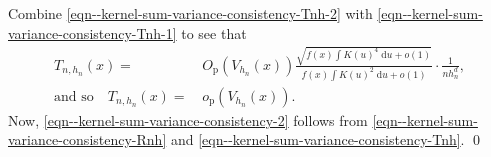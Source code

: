 Combine \eqref{eqn--kernel-sum-variance-consistency-Tnh-2} with
\eqref{eqn--kernel-sum-variance-consistency-Tnh-1} to see that
\begin{equation}
  \begin{split}
    T_{n, h_{n}} (x) =
    & \, O_{\mathrm{p}} \left( V_{h_{n}} (x) \right)
    \frac{\sqrt{f (x) \int K (u)^{4} \; \mathrm{d} u + o (1)}}{f (x)
    \int K (u)^{2} \; \mathrm{d} u + o (1)} \cdot \frac{1}{n h_{n}^{d}}, \\
    \text{and so} \quad T_{n, h_{n}} (x) =
    & \, o_{\mathrm{p}} \left( V_{h_{n}} (x)
    \right).
  \end{split}
  \label{eqn--kernel-sum-variance-consistency-Tnh}
\end{equation}
Now, \eqref{eqn--kernel-sum-variance-consistency-2} follows from
\eqref{eqn--kernel-sum-variance-consistency-Rnh} and
\eqref{eqn--kernel-sum-variance-consistency-Tnh}.
\qed


